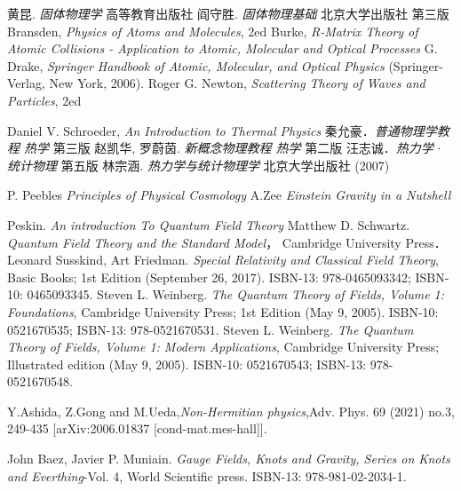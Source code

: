 \begin{thebibliography}{99}
黄昆. \textsl{固体物理学} 高等教育出版社
阎守胜. \textsl{固体物理基础} 北京大学出版社 第三版
Bransden, \textsl{Physics of Atoms and Molecules}, 2ed
Burke, \textsl{R-Matrix Theory of Atomic Collisions - Application to Atomic, Molecular and Optical Processes}
G. Drake, \textsl{Springer Handbook of Atomic, Molecular, and Optical Physics} (Springer-Verlag, New York, 2006).
Roger G. Newton, \textsl{Scattering Theory of Waves and Particles}, 2ed

Daniel V. Schroeder, \textsl{An Introduction to Thermal Physics}
秦允豪．\textsl{普通物理学教程 热学} 第三版
赵凯华, 罗蔚茵. \textsl{新概念物理教程 热学} 第二版
汪志诚．\textsl{热力学·统计物理}  第五版
林宗涵. \textsl{热力学与统计物理学} 北京大学出版社 (2007)

P. Peebles \textsl{Principles of Physical Cosmology}
A.Zee \textsl{Einstein Gravity in a Nutshell}

Peskin. \textsl{An introduction To Quantum Field Theory}
Matthew D. Schwartz. \textsl{Quantum Field Theory and the Standard Model}， Cambridge University Press．
Leonard Susskind, Art Friedman. \textsl{Special Relativity and Classical Field Theory}, Basic Books; 1st Edition (September 26, 2017). ISBN-13: 978-0465093342; ISBN-10: 0465093345. 
Steven L. Weinberg. \textsl{The Quantum Theory of Fields, Volume 1: Foundations}, Cambridge University Press; 1st Edition (May 9, 2005). ISBN-10: 0521670535; ISBN-13: 978-0521670531. 
Steven L. Weinberg. \textsl{The Quantum Theory of Fields, Volume 1: Modern Applications}, Cambridge University Press; Illustrated edition (May 9, 2005). ISBN-10: 0521670543; ISBN-13: 978-0521670548. 

Y.Ashida, Z.Gong and M.Ueda,\textsl{Non-Hermitian physics},Adv. Phys. 69 (2021) no.3, 249-435 [arXiv:2006.01837 [cond-mat.mes-hall]].

John Baez, Javier P. Muniain. \textsl{Gauge Fields, Knots and Gravity, Series on Knots and Everthing}-Vol. 4, World Scientific press. ISBN-13: 978-981-02-2034-1. 


\end{thebibliography}
